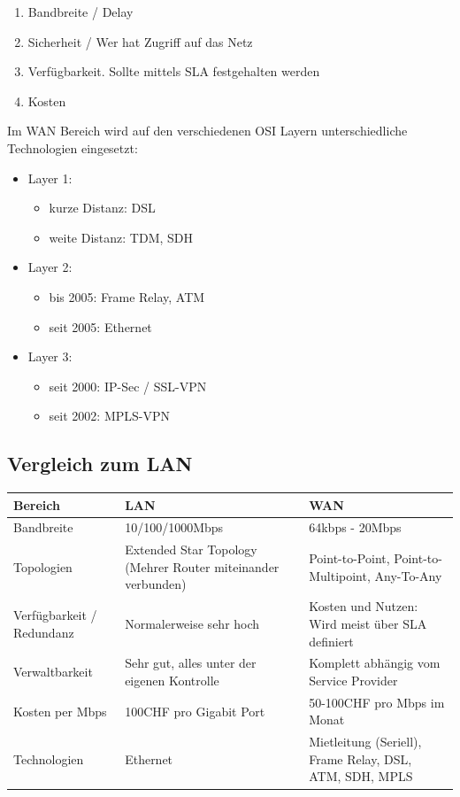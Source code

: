 \begin{enumerate}
	\item Bandbreite / Delay
	\item Sicherheit / Wer hat Zugriff auf das Netz
	\item Verfügbarkeit. Sollte mittels SLA festgehalten werden
	\item Kosten
\end{enumerate}

Im WAN Bereich wird auf den verschiedenen OSI Layern unterschiedliche Technologien eingesetzt:
\begin{itemize}
	 \item Layer 1: 
	 \begin{itemize}
	 	\item kurze Distanz: DSL
	 	\item weite Distanz: TDM, SDH
	 \end{itemize}
	\item Layer 2: 
	\begin{itemize}
		\item bis 2005: Frame Relay, ATM
		\item seit 2005: Ethernet
	\end{itemize}
	\item Layer 3: 
	\begin{itemize}
		\item seit 2000: IP-Sec / SSL-VPN
		\item seit 2002: MPLS-VPN
	\end{itemize}
\end{itemize}

\subsection{Vergleich zum LAN}
\begin{tabu} to \linewidth {|X|X|X|}
	\hline
	Bereich & LAN & WAN \\ 
	\hline \hline
	Bandbreite & 10/100/1000Mbps & 64kbps - 20Mbps\\	
	\hline
	Topologien & Extended Star Topology (Mehrer Router miteinander verbunden) & Point-to-Point, Point-to-Multipoint, Any-To-Any \\	
	\hline
	Verfügbarkeit / Redundanz & Normalerweise sehr hoch & Kosten und Nutzen: Wird meist über SLA definiert \\	
	\hline
	Verwaltbarkeit & Sehr gut, alles unter der eigenen Kontrolle & Komplett abhängig vom Service Provider \\	
	\hline
	Kosten per Mbps & 100CHF pro Gigabit Port & 50-100CHF pro Mbps im Monat \\	
	\hline
	Technologien & Ethernet & Mietleitung (Seriell), Frame Relay, DSL, ATM, SDH, MPLS \\	
	\hline
\end{tabu}

